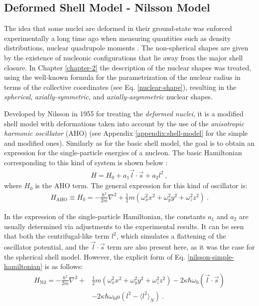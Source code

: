 \subsection{Deformed Shell Model - Nilsson Model}
\label{nilsson-model-section}

The idea that some nuclei are deformed in their ground-state was enforced experimentally a long time ago when measuring quantities such as density distributions, nuclear quadrupole moments \cite{casten2000nuclear}. The non-spherical shapes are given by the existence of nucleonic configurations that lie away from the major shell closure. In Chapter \ref{chapter-2} the description of the nuclear shapes was treated, using the well-known formula for the parametrization of the nuclear radius in terms of the collective coordinates (see Eq. \ref{nuclear-shape}), resulting in the \emph{spherical}, \emph{axially-symmetric}, and \emph{axially-asymmetric} nuclear shapes.

Developed by Nilsson in 1955 \cite{nilsson1955binding} for treating the \emph{deformed nuclei}, it is a modified shell model with deformations taken into account by the use of the \emph{anisotropic harmonic oscillator} (AHO) (see Appendix \ref{appendix:shell-model} for the simple and modified ones). Similarly as for the basic shell model, the goal is to obtain an expression for the single-particle energies of a nucleon. The basic Hamiltonian corresponding to this kind of system is shown below \cite{bertulani2007nuclear}:
\begin{align}
    H=H_0+a_1\vec{l}\cdot\vec{s}+a_2l^2\ ,
    \label{nilsson-simple-hamiltonian}
\end{align}
where $H_0$ is the AHO term. The general expression for this kind of oscillator is:
\begin{align}
    H_\text{AHO}\equiv H_0=-\frac{\hbar^2}{2m}\nabla^2+\frac{1}{2}m(\omega_x^2x^2+\omega_y^2y^2+\omega_z^2z^2)\ .
\end{align}

In the expression of the single-particle Hamiltonian, the constants $a_1$ and $a_2$ are usually determined via adjustments to the experimental results. It can be seen that both the centrifugal-like term $l^2$, which simulates a flattening of the oscillator potential, and the $\vec{l}\cdot\vec{s}$ term are also present here, as it was the case for the spherical shell model. However, the explicit form of Eq. \ref{nilsson-simple-hamiltonian} is as follows:
\begin{align}
    H_\text{Nil}=-\frac{\hbar^2}{2m}\nabla^2+&\frac{1}{2}m(\omega_x^2x^2+\omega_y^2y^2+\omega_z^2z^2)-2\kappa\hbar\omega_0(\vec{l}\cdot\vec{s})\nonumber\\&-2\kappa\hbar\omega_0\mu\left(l^2-\langle l^2\rangle_N\right)\ .
    \label{eq-full-nilsson-ham}
\end{align}

